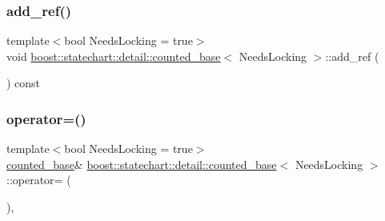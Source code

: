 \subsubsection{\texorpdfstring{add\+\_\+ref()}{add\_ref()}}
{\footnotesize\ttfamily template$<$bool Needs\+Locking = true$>$ \\
void \mbox{\hyperlink{classboost_1_1statechart_1_1detail_1_1counted__base}{boost\+::statechart\+::detail\+::counted\+\_\+base}}$<$ Needs\+Locking $>$\+::add\+\_\+ref (\begin{DoxyParamCaption}{ }\end{DoxyParamCaption}) const\hspace{0.3cm}{\ttfamily [inline]}}

\mbox{\label{classboost_1_1statechart_1_1detail_1_1counted__base_a4b7bb95008578c9069bbecfb35f3786f}} 
\subsubsection{\texorpdfstring{operator=()}{operator=()}}
{\footnotesize\ttfamily template$<$bool Needs\+Locking = true$>$ \\
\mbox{\hyperlink{classboost_1_1statechart_1_1detail_1_1counted__base}{counted\+\_\+base}}\& \mbox{\hyperlink{classboost_1_1statechart_1_1detail_1_1counted__base}{boost\+::statechart\+::detail\+::counted\+\_\+base}}$<$ Needs\+Locking $>$\+::operator= (\begin{DoxyParamCaption}\item[{const \mbox{\hyperlink{classboost_1_1statechart_1_1detail_1_1counted__base}{counted\+\_\+base}}$<$ Needs\+Locking $>$ \&}]{ }\end{DoxyParamCaption})\hspace{0.3cm}{\ttfamily [inline]}, {\ttfamily [protected]}}

\mbox{\label{classboost_1_1statechart_1_1detail_1_1counted__base_ab278d2aba3d8362be9509890ebf1a5db}} 

